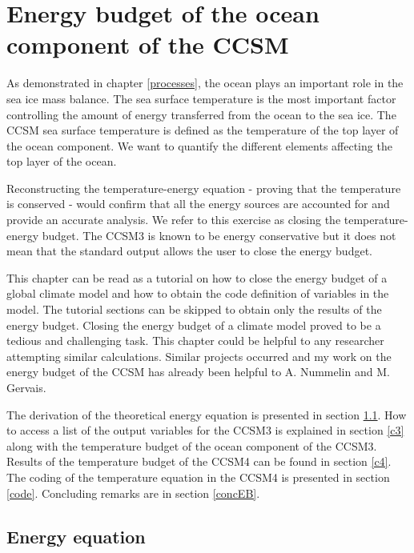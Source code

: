 \section{Energy budget of the ocean component of the CCSM}
\label{vert}

As demonstrated in chapter \ref{processes}, the ocean plays an important role in the sea ice mass balance. The sea surface temperature is the most important factor controlling the amount of energy transferred from the ocean to the sea ice. The CCSM sea surface temperature is defined as the temperature of the top layer of the ocean component. We want to quantify the different elements affecting the top layer of the ocean. 

Reconstructing the temperature-energy equation - proving that the temperature is conserved - would confirm that all the energy sources are accounted for and provide an accurate analysis. We refer to this exercise as closing the temperature-energy budget. The CCSM3 is known to be energy conservative \citep{SG4} but it does not mean that the standard output allows the user to close the energy budget.

This chapter can be read as a tutorial on how to close the energy budget of a global climate model and how to obtain the code definition of variables in the model. The tutorial sections can be skipped to obtain only the results of the energy budget. Closing the energy budget of a climate model proved to be a tedious and challenging task. This chapter could be helpful to any researcher attempting similar calculations. Similar projects occurred and my work on the energy budget of the CCSM has already been helpful to A. Nummelin and M. Gervais. 

The derivation of the theoretical energy equation is presented in section \ref{energeq}. How to access a list of the output variables for the CCSM3 is explained in section \ref{c3} along with the temperature budget of the ocean component of the CCSM3. Results of the temperature budget of the CCSM4 can be found in section \ref{c4}. The coding of the temperature equation in the CCSM4 is presented in section \ref{code}. Concluding remarks are in section \ref{concEB}.

\subsection{Energy equation}\label{energeq}

